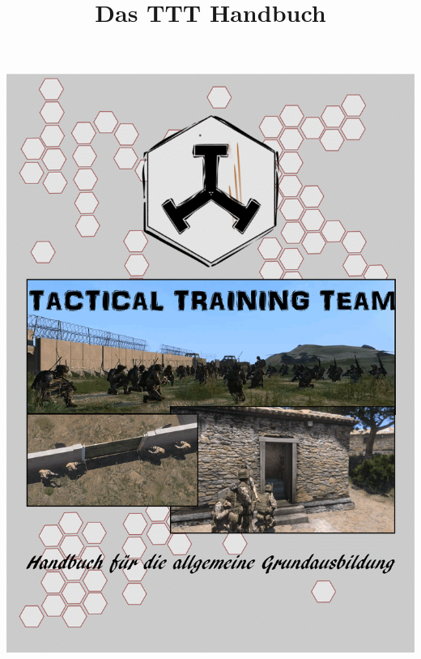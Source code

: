 \title{Das TTT Handbuch}
\begin{titlepage}
	\begin{center}
		\begin{minipage}[t]{1\textwidth}
			\centering
			\includegraphics[width=\textwidth]{./Grafiken/Abschnitt/TTTitelbild.png}
		\end{minipage}
	\end{center}
\end{titlepage}